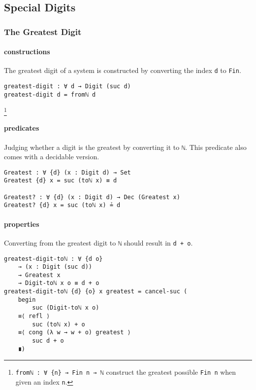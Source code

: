 \documentclass[\main/thesis.tex]{subfiles}
\begin{document}
\subsection{Special Digits}

\subsubsection{The Greatest Digit}

\paragraph{constructions}

The greatest digit of a system is constructed by converting the index {\lstinline|d|}
to {\lstinline|Fin|}.

\begin{lstlisting}
greatest-digit : ∀ d → Digit (suc d)
greatest-digit d = fromℕ d
\end{lstlisting}
\footnote{
    {\lstinline|fromℕ : ∀ {n} → Fin n → ℕ|}
    \newline\hspace*{4em} construct the greatest possible {\lstinline|Fin n|} when given an index {\lstinline|n|}.
}

\paragraph{predicates}

Judging whether a digit is the greatest by converting it to {\lstinline|ℕ|}.
This predicate also comes with a decidable version.

\begin{lstlisting}
Greatest : ∀ {d} (x : Digit d) → Set
Greatest {d} x = suc (toℕ x) ≡ d

Greatest? : ∀ {d} (x : Digit d) → Dec (Greatest x)
Greatest? {d} x = suc (toℕ x) ≟ d
\end{lstlisting}

\paragraph{properties}

Converting from the greatest digit to {\lstinline|ℕ|} should result in {\lstinline|d + o|}.

\begin{lstlisting}
greatest-digit-toℕ : ∀ {d o}
    → (x : Digit (suc d))
    → Greatest x
    → Digit-toℕ x o ≡ d + o
greatest-digit-toℕ {d} {o} x greatest = cancel-suc (
    begin
        suc (Digit-toℕ x o)
    ≡⟨ refl ⟩
        suc (toℕ x) + o
    ≡⟨ cong (λ w → w + o) greatest ⟩
        suc d + o
    ∎)
\end{lstlisting}
\end{document}
